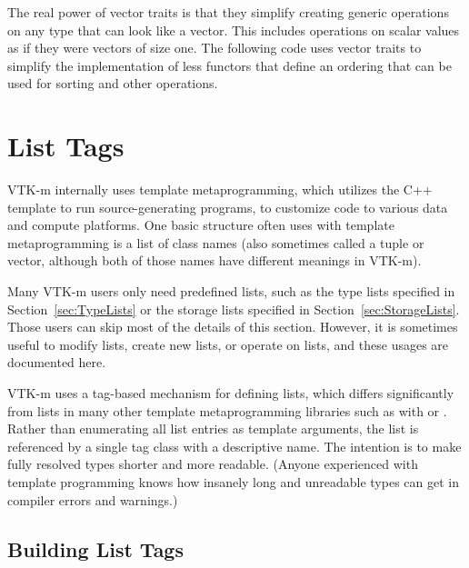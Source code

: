 
The real power of vector traits is that they simplify creating generic
operations on any type that can look like a vector. This includes
operations on scalar values as if they were vectors of size one. The
following code uses vector traits to simplify the implementation of less
functors that define an ordering that can be used for sorting
and other operations.




\section{List Tags}
\label{sec:ListTags}


VTK-m internally uses template metaprogramming, which utilizes the C++
template to run source-generating programs, to customize code to various
data and compute platforms. One basic structure often uses with template
metaprogramming is a list of class names (also sometimes called a tuple or
vector, although both of those names have different meanings in VTK-m).

Many VTK-m users only need predefined lists, such as the type lists
specified in Section~\ref{sec:TypeLists} or the storage lists specified
in Section~\ref{sec:StorageLists}. Those users can skip most of the
details of this section. However, it is sometimes useful to modify lists,
create new lists, or operate on lists, and these usages are documented
here.

VTK-m uses a tag-based mechanism for defining lists, which differs
significantly from lists in many other template metaprogramming libraries
such as with  or
. Rather than enumerating all list
entries as template arguments, the list is referenced by a single tag class
with a descriptive name. The intention is to make fully resolved types
shorter and more readable. (Anyone experienced with template programming
knows how insanely long and unreadable types can get in compiler errors and
warnings.)

\subsection{Building List Tags}
\label{sec:BuildingListTags}

